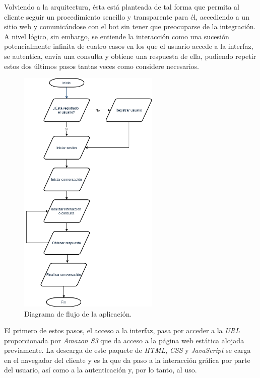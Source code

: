 \documentclass[11pt,spanish,listoffigures]{tfgetsinf}
\begin{document}
Volviendo a la arquitectura, ésta está planteada de tal forma que permita al cliente seguir un procedimiento sencillo y transparente para él, accediendo a un sitio web y comunicándose con el bot sin tener que preocuparse de la integración. A nivel lógico, sin embargo, se entiende la interacción como una sucesión potencialmente infinita de cuatro casos en los que el usuario accede a la interfaz, se autentica, envía una consulta y obtiene una respuesta de ella, pudiendo repetir estos dos últimos pasos tantas veces como considere necesarios.

\begin{figure}[h!]
    \centering
    \includegraphics[width=0.6\textwidth]{images/img05.png}
    \caption{Diagrama de flujo de la aplicación.}
\end{figure}

El primero de estos pasos, el acceso a la interfaz, pasa por acceder a la \textit{URL} proporcionada por \textit{Amazon S3} que da acceso a la página web estática alojada previamente. La descarga de este paquete de \textit{HTML}, \textit{CSS} y \textit{JavaScript} se carga en el navegador del cliente y es la que da paso a la interacción gráfica por parte del usuario, así como a la autenticación y, por lo tanto, al uso.
\end{document}
